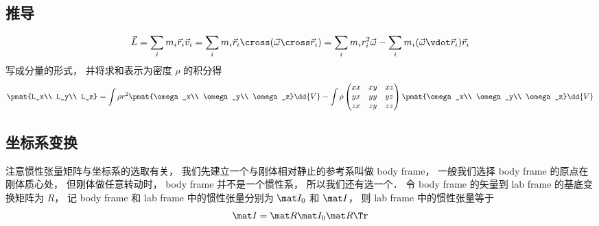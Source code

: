 \subsection{推导}
\begin{equation}
\vec L = \sum_i m_i \vec r_i \vec v_i = \sum_i m_i \vec r_i \cross (\vec \omega \cross \vec r_i) = \sum_i m_i r_i^2 \vec \omega - \sum_i m_i (\vec \omega \vdot \vec r_i) \vec r_i
\end{equation}
写成分量的形式， 并将求和表示为密度 $\rho$ 的积分得
\begin{equation}
\pmat{L_x\\ L_y\\ L_z} = \int \rho r^2 \pmat{\omega_x\\ \omega_y\\ \omega_z} \dd{V} - \int \rho
\begin{pmatrix}
xx & xy & xz\\
yx & yy & yz\\
zx & zy & zz
\end{pmatrix}
\pmat{\omega_x\\ \omega_y\\ \omega_z} \dd{V}
\end{equation}

\subsection{坐标系变换}
注意惯性张量矩阵与坐标系的选取有关， 我们先建立一个与刚体相对静止的参考系叫做 body frame，%
一般我们选择 body frame 的原点在刚体质心处， 但刚体做任意转动时， body frame 并不是一个惯性系， 所以我们还有选一个． 令 body frame 的矢量到 lab frame 的基底变换矩阵为 $R$， 记 body frame 和 lab frame 中的惯性张量分别为 $\mat I_0$ 和 $\mat I$， 则 lab frame 中的惯性张量等于
\begin{equation}
\mat I = \mat R \mat I_0 \mat R\Tr
\end{equation}

